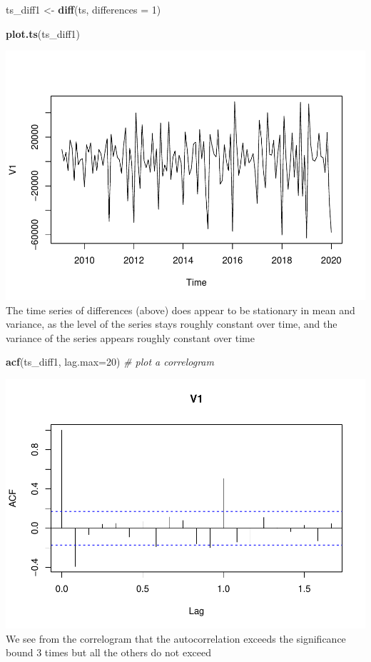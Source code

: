 \documentclass[
]{article}
\newenvironment{Shaded}{\begin{snugshade}}{\end{snugshade}}
\newcommand{\CommentTok}[1]{\textcolor[rgb]{0.56,0.35,0.01}{\textit{#1}}}
\newcommand{\DataTypeTok}[1]{\textcolor[rgb]{0.13,0.29,0.53}{#1}}
\newcommand{\DecValTok}[1]{\textcolor[rgb]{0.00,0.00,0.81}{#1}}
\newcommand{\KeywordTok}[1]{\textcolor[rgb]{0.13,0.29,0.53}{\textbf{#1}}}
\newcommand{\NormalTok}[1]{#1}
\newcommand{\StringTok}[1]{\textcolor[rgb]{0.31,0.60,0.02}{#1}}
\begin{document}
\begin{Shaded}
\begin{Highlighting}[]
\NormalTok{ts_diff1 <-}\StringTok{  }\KeywordTok{diff}\NormalTok{(ts, }\DataTypeTok{differences =} \DecValTok{1}\NormalTok{)}

\KeywordTok{plot.ts}\NormalTok{(ts_diff1)}
\end{Highlighting}
\end{Shaded}

\includegraphics{tsf_export_files/figure-latex/unnamed-chunk-20-2.pdf}
The time series of differences (above) does appear to be stationary in
mean and variance, as the level of the series stays roughly constant
over time, and the variance of the series appears roughly constant over
time

\begin{Shaded}
\begin{Highlighting}[]
\KeywordTok{acf}\NormalTok{(ts_diff1, }\DataTypeTok{lag.max=}\DecValTok{20}\NormalTok{)             }\CommentTok{# plot a correlogram}
\end{Highlighting}
\end{Shaded}

\includegraphics{tsf_export_files/figure-latex/unnamed-chunk-21-1.pdf}
We see from the correlogram that the autocorrelation exceeds the
significance bound 3 times but all the others do not exceed
\end{document}

